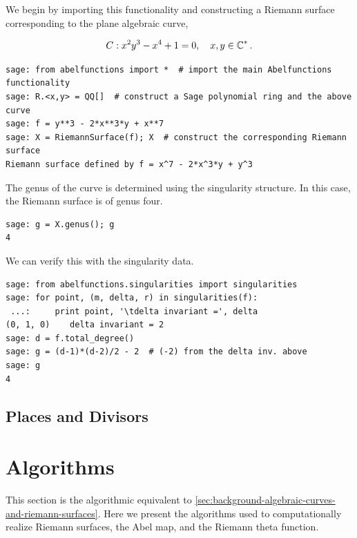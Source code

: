 \noindent We begin by importing this functionality and constructing a Riemann
surface corresponding to the plane algebraic curve,

\[
  C : x^2y^3 - x^4 + 1 = 0, \quad x,y \in \operatorname{\mathbb{C}}^*.
\]

\begin{lstlisting}[language=Sage]
sage: from abelfunctions import *  # import the main Abelfunctions functionality
sage: R.<x,y> = QQ[]  # construct a Sage polynomial ring and the above curve
sage: f = y**3 - 2*x**3*y + x**7
sage: X = RiemannSurface(f); X  # construct the corresponding Riemann surface
Riemann surface defined by f = x^7 - 2*x^3*y + y^3
\end{lstlisting}

\noindent The genus of the curve is determined using the singularity structure.
In this case, the Riemann surface is of genus four.

\begin{lstlisting}[language=Sage]
sage: g = X.genus(); g
4
\end{lstlisting}

\noindent We can verify this with the singularity data.

\begin{lstlisting}[language=Sage]
sage: from abelfunctions.singularities import singularities
sage: for point, (m, delta, r) in singularities(f):
 ...:     print point, '\tdelta invariant =', delta
(0, 1, 0)    delta invariant = 2
sage: d = f.total_degree()
sage: g = (d-1)*(d-2)/2 - 2  # (-2) from the delta inv. above
sage: g
4
\end{lstlisting}

\subsection{Places and Divisors}


\section{Algorithms}\label{sec:abelfunctions-algorithms}

This section is the algorithmic equivalent to
\autoref{sec:background-algebraic-curves-and-riemann-surfaces}. Here we present
the algorithms used to computationally realize Riemann surfaces, the Abel map,
and the Riemann theta function.

